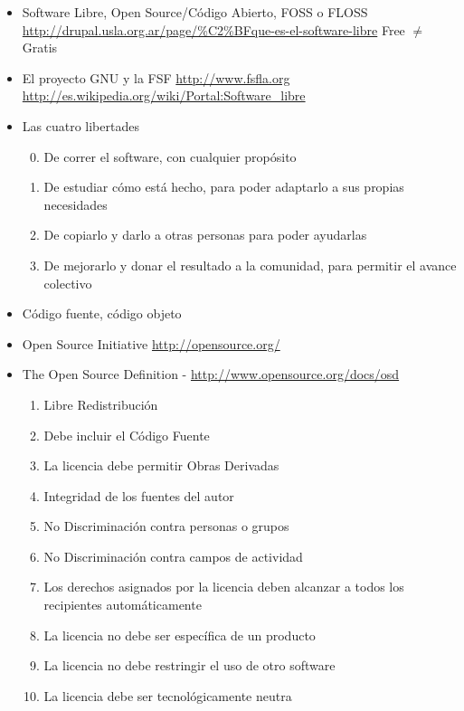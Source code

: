 \begin{itemize}
	\item Software Libre, Open Source/Código Abierto, FOSS o FLOSS
	\subitem \url{http://drupal.usla.org.ar/page/%C2%BFque-es-el-software-libre}
	\subitem Free $\neq$ Gratis
	\item El proyecto GNU y la FSF
	\subitem \url{http://www.fsfla.org}
	\subitem \url {http://es.wikipedia.org/wiki/Portal:Software_libre}
	\item Las cuatro libertades
\begin{enumerate} \setcounter{enumi}{-1}
	\item De correr el software, con cualquier propósito
	\item De estudiar cómo está hecho, para poder adaptarlo a sus propias necesidades
	\item De copiarlo y darlo a otras personas para poder ayudarlas
	\item De mejorarlo y donar el resultado a la comunidad, para permitir el avance colectivo
\end{enumerate}
	\item Código fuente, código objeto
	\item Open Source Initiative
	\subitem \url{http://opensource.org/} 
	\item The Open Source Definition - \url{http://www.opensource.org/docs/osd}
	\begin{enumerate}	
	\item Libre Redistribución
	\item Debe incluir el Código Fuente
	\item La licencia debe permitir Obras Derivadas
	\item Integridad de los fuentes del autor
	\item No Discriminación contra personas o grupos
	\item No Discriminación contra campos de actividad
	\item Los derechos asignados por la licencia deben alcanzar a todos los recipientes automáticamente
	\item La licencia no debe ser específica de un producto
	\item La licencia no debe restringir el uso de otro software
	\item La licencia debe ser tecnológicamente neutra
\end{enumerate}
\end{itemize}





